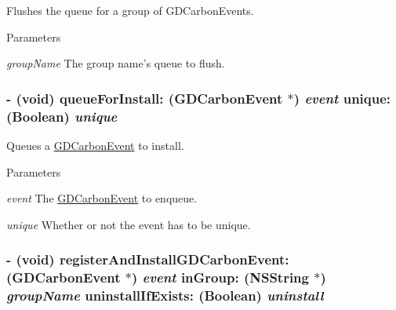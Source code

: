 Flushes the queue for a group of GDCarbonEvents. 
\begin{DoxyParams}{Parameters}
\item[{\em groupName}]The group name's queue to flush. \end{DoxyParams}
\hypertarget{interface_g_d_carbon_event_manager_a1eddf82bb8d798147c3fcde4aa81ed34}{
\subsubsection[{queueForInstall:unique:}]{\setlength{\rightskip}{0pt plus 5cm}-\/ (void) queueForInstall: ({\bf GDCarbonEvent} $\ast$) {\em event}\/ unique: (Boolean) {\em unique}}}
\label{interface_g_d_carbon_event_manager_a1eddf82bb8d798147c3fcde4aa81ed34}


Queues a \hyperlink{interface_g_d_carbon_event}{GDCarbonEvent} to install. 
\begin{DoxyParams}{Parameters}
\item[{\em event}]The \hyperlink{interface_g_d_carbon_event}{GDCarbonEvent} to enqueue. \item[{\em unique}]Whether or not the event has to be unique. \end{DoxyParams}
\hypertarget{interface_g_d_carbon_event_manager_a5bb7116bfbb92eb5bf5651192c855611}{
\subsubsection[{registerAndInstallGDCarbonEvent:inGroup:uninstallIfExists:}]{\setlength{\rightskip}{0pt plus 5cm}-\/ (void) registerAndInstallGDCarbonEvent: ({\bf GDCarbonEvent} $\ast$) {\em event}\/ inGroup: (NSString $\ast$) {\em groupName}\/ uninstallIfExists: (Boolean) {\em uninstall}}}
\label{interface_g_d_carbon_event_manager_a5bb7116bfbb92eb5bf5651192c855611}


